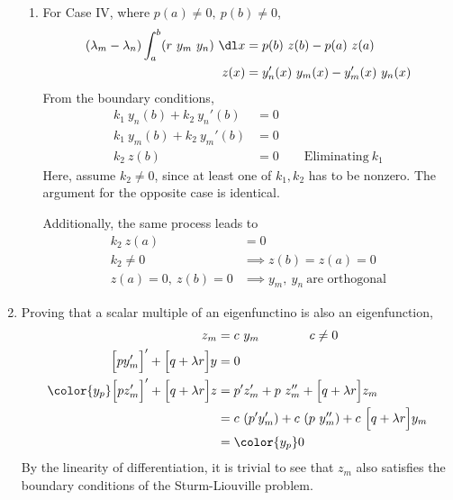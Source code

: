 \begin{enumerate}
\begin{enumerate}
              \item For Case IV, where $ p(a) \neq 0 ,\ p(b) \neq 0$,
                    \begin{align}
                        (\lambda_m - \lambda_n) \int_{a}^{b} (r\ y_m\ y_n)\ \dl x
                             & = p(b) \ z(b) - p(a)\ z(a)          \\
                        z(x) & = y_n'(x)\ y_m(x) - y_m'(x)\ y_n(x)
                    \end{align}
                    From the boundary conditions,
                    \begin{align}
                        k_1\ y_n(b) + k_2\ y_n'(b) & = 0        \\
                        k_1\ y_m(b) + k_2\ y_m'(b) & = 0        \\
                        k_2\ z(b)                  & = 0 \qquad
                        \text{Eliminating}\ k_1
                    \end{align}
                    Here, assume $ k_2 \neq 0 $, since at least one of $ k_1, k_2 $ has
                    to be nonzero. The argument for the opposite case is identical. \par
                    Additionally, the same process leads to
                    \begin{align}
                        k_2\ z(a)           & = 0                       \\
                        k_2 \neq 0          & \implies z(b) = z(a) =  0 \\
                        z(a) = 0,\ z(b) = 0 & \implies y_m,\ y_n
                        \ \text{are orthogonal}
                    \end{align}
          \end{enumerate}

    \item Proving that a scalar multiple of an eigenfunctino is also an
          eigenfunction,
          \begin{align}
              z_m                                           & = c\ y_m \qquad\qquad
              c \neq 0                                                              \\
              \Big[p y_m'\Big]' + \Big[q + \lambda r\Big] y & = 0                   \\
              \color{y_p}\Big[p z_m'\Big]'
              + \Big[q + \lambda r\Big] z                   & =
              p'z_m' + p\ z_m'' + \Big[ q + \lambda r \Big] z_m                     \\
                                                            & =
              c\ (p' y_m') + c\ (p\ y_m'')
              + c\ \Big[q + \lambda r\Big]y_m                                       \\
                                                            & = \color{y_p}0
          \end{align}
          By the linearity of differentiation, it is trivial to see that $ z_m $ also
          satisfies the boundary conditions of the Sturm-Liouville problem.


\end{enumerate}
